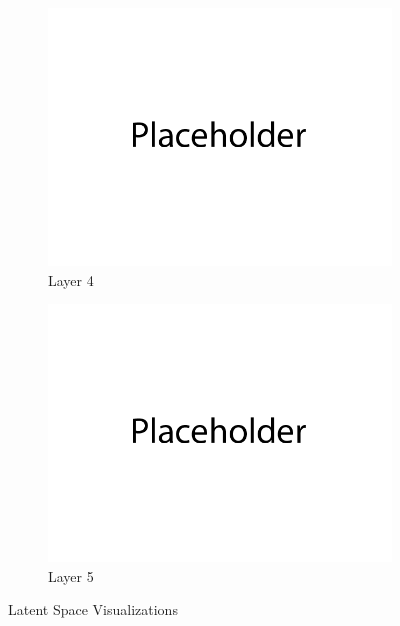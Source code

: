 \documentclass{article}
\begin{document}
\begin{figure}[H]
\begin{subfigure}{0.32\textwidth}
        \includegraphics[width=\textwidth]{figures/q1_latent_space_layer_4.png}
        \caption{Layer 4}
    \end{subfigure}
    \begin{subfigure}{0.32\textwidth}
        \centering
        \includegraphics[width=\textwidth]{figures/q1_latent_space_layer_5.png}
        \caption{Layer 5}
    \end{subfigure}
    \caption{Latent Space Visualizations}
\end{figure}

\newpage
{}
\end{document}
